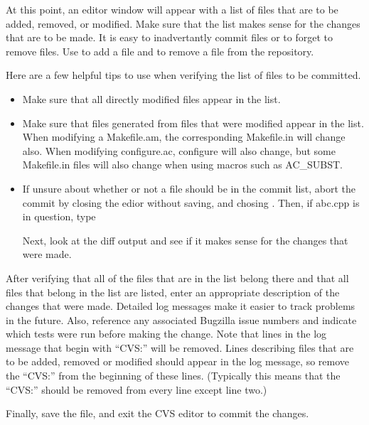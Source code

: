 \documentclass[12pt,relax]{TrilinosDevGuide}
\begin{document}
\begin{itemize}

At this point, an editor window will appear with a list of files that are to 
be added, removed, or modified.  Make sure that the list makes sense for the 
changes that are to be made.  It is easy to inadvertantly commit files or to 
forget to remove files.  Use  to add a file and
 to remove a file from the repository.  

Here are a few helpful tips to use when verifying the list of files 
to be committed.  
\begin{itemize}
\item Make sure that all directly modified files appear in the list.  
\item Make sure that files generated from files that were modified 
appear in the list.  When modifying a Makefile.am, the corresponding 
Makefile.in will change also.  When modifying configure.ac, configure will 
also change, but some Makefile.in files will also change when using macros 
such as AC\_SUBST.  
\item If unsure about whether or not a 
file should be in the commit list, abort the commit by closing the edior 
without saving, and chosing .  Then, if abc.cpp is in 
question, type 


Next, look at the diff output and see if it makes sense for the changes that 
were made.  

\end{itemize}

After verifying that all of the files that are in the list belong 
there and that all files that belong in the list are listed, enter an 
appropriate description of the changes that were made.  Detailed log 
messages make it easier to track problems in the future.  Also, reference any 
associated Bugzilla issue numbers and indicate which tests were run before 
making the change.  Note that lines in the log message that begin with 
``CVS:'' will be removed.  Lines describing files that are to be added, 
removed or modified should appear in the log message, so remove the ``CVS:'' 
from the beginning of these lines.  (Typically this means that the ``CVS:'' 
should be removed from every line except line two.)

Finally, save the file, and exit the CVS editor to commit the changes.


\end{itemize}
\end{document}
